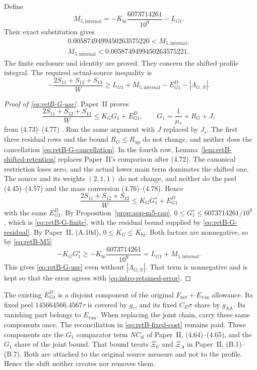Define
\begin{equation}\label{eq:retB-M5}
 M_{5,\mathrm{internal}}
   =-K_{\mathrm{hi}}\frac{6073714261}{10^9}-L_{G1}.
\end{equation}
Their exact substitution gives
\begin{equation}\label{eq:retB-M5-value}
\begin{gathered}
 0.0058749499450263575220<M_{5,\mathrm{internal}},\\
 M_{5,\mathrm{internal}}<0.0058749499450263575221.
\end{gathered}
\end{equation}
The finite enclosure and identity are proved.
They concern the shifted profile integral.
The required actual-source inequality is
\begin{equation}\label{eq:retB-G-use}
 -\frac{2S_{11}+S_{12}+S_{13}}{W}
 \ge L_{G1}+M_{5,\mathrm{internal}}
       -E^D_{G1}-|\Lambda_{G,N}|.
\end{equation}

\begin{proof}[Proof of \eqref{eq:retB-G-use}]
Paper~II proves
\[
 \frac{2S_{11}+S_{12}+S_{13}}W\le K_GG_1+E^D_{G1},\qquad
 G_1=\frac1{\mu_*}+R_G+J,
\]
from (4.73)--(4.77) \cite[(4.75), (4.78)]{PaperII}. Run the same argument
with $J$ replaced by $J_s$. The first three residual rows and the bound
$R_G\le R_{\mathrm{up}}$ do not change, and neither does the cancellation
\eqref{eq:retB-G-cancellation}. In the fourth row,
Lemma~\ref{lem:retB-shifted-retention} replaces Paper~II's comparison after
(4.72). The canonical restriction loses zero, and the actual lower main term
dominates the shifted one. The source and its weights $(2,1,1)$ do not
change, and neither do the peel (4.45)--(4.57) and the mass conversion
(4.76)--(4.78). Hence
\[
 \frac{2S_{11}+S_{12}+S_{13}}W\le K_GG_1^s+E^D_{G1}
\]
with the same $E^D_{G1}$. By Proposition~\ref{prop:app-m5-cap},
$0\le G_1^s\le6073714261/10^9$, which is \eqref{eq:retB-G-finite}, with the
residual bound supplied by \eqref{eq:retB-G-residual}. By
Paper~II, (A.10d), $0\le K_G\le K_{\mathrm{hi}}$. Both factors are
nonnegative, so by \eqref{eq:retB-M5}
\[
 -K_GG_1^s\ge-K_{\mathrm{hi}}\frac{6073714261}{10^9}=L_{G1}+M_{5,\mathrm{internal}}.
\]
This gives \eqref{eq:retB-G-use} even without $|\Lambda_{G,N}|$. That term
is nonnegative and is kept so that the error agrees with
\eqref{eq:intro-retained-error}.
\end{proof}
The existing $E^D_{G1}$ is a disjoint component of the original
$F_{\mathrm{net}}+E_{\mathrm{van}}$ allowance.
Its fixed peel $145664566.4567\tau$ is covered by $g_\tau$,
and its fixed $C_E\sigma$ share by $g_{\mathrm{AA}}$.
Its vanishing part belongs to $E_{\mathrm{van}}$.
When replacing the joint chain, carry these same components once.
The reconciliation in \eqref{eq:retB-fixed-cost} remains paid.
These components are the $G_1$ comparator term $NC_{\mathrm{sf}}$ of
Paper~II, (4.64)--(4.65), and the $G_1$ share of the joint bound. That
bound treats $\Xi_U$ and $\Xi_A$ in Paper~II, (B.1)--(B.7). Both are
attached to the original source measure and not to the profile. Hence the
shift neither creates nor removes them.

